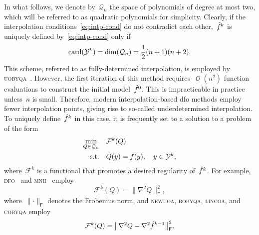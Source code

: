 \documentclass[draft]{article}
\numberwithin{equation}{section}
\theoremstyle{definition}
\theoremstyle{plain}
\theoremstyle{remark}
\DeclareMathOperator{\bigo}{\mathcal{O}}
\DeclareMathOperator{\card}{card}
\newcommand*{\norm}[2][]{#1\lVert#2#1\rVert}
\newcommand*{\obj}{f}
\newcommand*{\objm}[1][]{\hat{\obj}\ifblank{#1}{}{^{#1}}}
\newcommand*{\qpoly}{\mathcal{Q}_n}
\newcommand*{\solvername}[1]{\textsc{#1}\xspace}
\newcommand*{\xpt}[1][]{\mathcal{Y}\ifblank{#1}{}{^{#1}}}
\begin{document}
In what follows, we denote by~$\qpoly$ the space of polynomials of degree at most two, which will be referred to as quadratic polynomials for simplicity.
Clearly, if the interpolation conditions~\eqref{eq:intp-cond} do not contradict each other,~$\objm[k]$ is uniquely defined by~\eqref{eq:intp-cond} only if
\begin{equation*}
    \card(\xpt[k]) = \dim(\qpoly) = \frac{1}{2} (n + 1) (n + 2).
\end{equation*}
This scheme, referred to as fully-determined interpolation, is employed by \solvername{uobyqa}~\cite{Powell_2002}.
However, the first iteration of this method requires~$\bigo(n^2)$ function evaluations to construct the initial model~$\objm[0]$.
This is impracticable in practice unless~$n$ is small.
Therefore, modern interpolation-based \gls{dfo} methods employ fewer interpolation points, giving rise to so-called underdetermined interpolation.
To uniquely define~$\objm[k]$ in this case, it is frequently set to a solution to a problem of the form
\begin{equation}
    \label{eq:intp-var}
    \begin{aligned}
        \min_{Q \in \qpoly} & \quad \mathcal{F}^k(Q)\\
        \text{s.t.}         & \quad Q(y) = \obj(y), \quad y \in \xpt[k],
    \end{aligned}
\end{equation}
where~$\mathcal{F}^k$ is a functional that promotes a desired regularity of~$\objm[k]$.
For example, \solvername{dfo}~\cite{Conn_Scheinberg_Toint_1998} and \solvername{mnh}~\cite{Wild_2008} employ
\begin{equation}
    \label{eq:mnh}
    \mathcal{F}^k(Q) = \norm[\big]{\nabla^2 Q}_{\mathsf{F}}^2,
\end{equation}
where~$\norm{\cdot}_{\mathsf{F}}$ denotes the Frobenius norm, and \solvername{newuoa}, \solvername{bobyqa}, \solvername{lincoa}, and \solvername{cobyqa} employ
\begin{equation}
    \label{eq:df-psb}
    \mathcal{F}^k(Q) = \norm[\big]{\nabla^2 Q - \nabla^2 \objm[k - 1]}_{\mathsf{F}}^2,
\end{equation}
\end{document}
